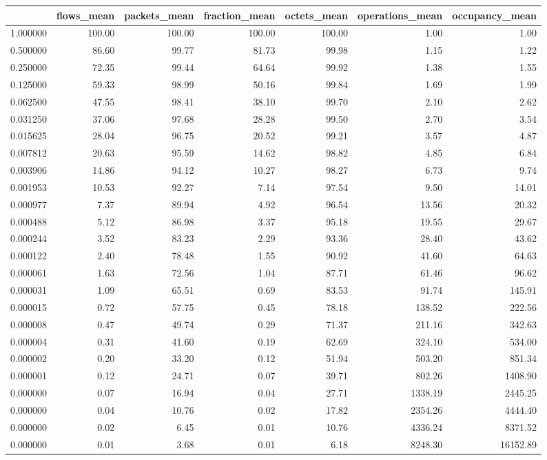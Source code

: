 \begin{tabular}{lrrrrrr}
\toprule
 & flows_mean & packets_mean & fraction_mean & octets_mean & operations_mean & occupancy_mean \\
\midrule
1.000000 & 100.00 & 100.00 & 100.00 & 100.00 & 1.00 & 1.00 \\
0.500000 & 86.60 & 99.77 & 81.73 & 99.98 & 1.15 & 1.22 \\
0.250000 & 72.35 & 99.44 & 64.64 & 99.92 & 1.38 & 1.55 \\
0.125000 & 59.33 & 98.99 & 50.16 & 99.84 & 1.69 & 1.99 \\
0.062500 & 47.55 & 98.41 & 38.10 & 99.70 & 2.10 & 2.62 \\
0.031250 & 37.06 & 97.68 & 28.28 & 99.50 & 2.70 & 3.54 \\
0.015625 & 28.04 & 96.75 & 20.52 & 99.21 & 3.57 & 4.87 \\
0.007812 & 20.63 & 95.59 & 14.62 & 98.82 & 4.85 & 6.84 \\
0.003906 & 14.86 & 94.12 & 10.27 & 98.27 & 6.73 & 9.74 \\
0.001953 & 10.53 & 92.27 & 7.14 & 97.54 & 9.50 & 14.01 \\
0.000977 & 7.37 & 89.94 & 4.92 & 96.54 & 13.56 & 20.32 \\
0.000488 & 5.12 & 86.98 & 3.37 & 95.18 & 19.55 & 29.67 \\
0.000244 & 3.52 & 83.23 & 2.29 & 93.36 & 28.40 & 43.62 \\
0.000122 & 2.40 & 78.48 & 1.55 & 90.92 & 41.60 & 64.63 \\
0.000061 & 1.63 & 72.56 & 1.04 & 87.71 & 61.46 & 96.62 \\
0.000031 & 1.09 & 65.51 & 0.69 & 83.53 & 91.74 & 145.91 \\
0.000015 & 0.72 & 57.75 & 0.45 & 78.18 & 138.52 & 222.56 \\
0.000008 & 0.47 & 49.74 & 0.29 & 71.37 & 211.16 & 342.63 \\
0.000004 & 0.31 & 41.60 & 0.19 & 62.69 & 324.10 & 534.00 \\
0.000002 & 0.20 & 33.20 & 0.12 & 51.94 & 503.20 & 851.34 \\
0.000001 & 0.12 & 24.71 & 0.07 & 39.71 & 802.26 & 1408.90 \\
0.000000 & 0.07 & 16.94 & 0.04 & 27.71 & 1338.19 & 2445.25 \\
0.000000 & 0.04 & 10.76 & 0.02 & 17.82 & 2354.26 & 4444.40 \\
0.000000 & 0.02 & 6.45 & 0.01 & 10.76 & 4336.24 & 8371.52 \\
0.000000 & 0.01 & 3.68 & 0.01 & 6.18 & 8248.30 & 16152.89 \\
\bottomrule
\end{tabular}
